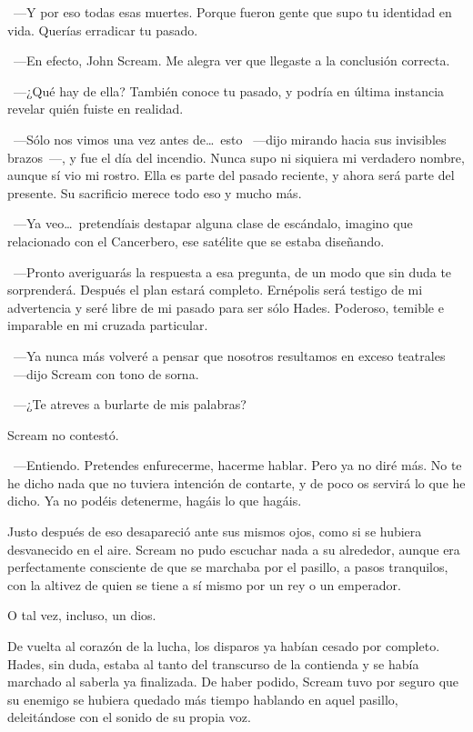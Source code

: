 ~---Y por eso todas esas muertes. Porque fueron gente que supo tu identidad en vida. Querías erradicar tu pasado.

~---En efecto, John Scream. Me alegra ver que llegaste a la conclusión correcta.

~---¿Qué hay de ella? También conoce tu pasado, y podría en última instancia revelar quién fuiste en realidad.

~---Sólo nos vimos una vez antes de\dots\ esto ~---dijo mirando hacia sus invisibles brazos~---, y fue el día del incendio. Nunca supo ni siquiera mi verdadero nombre, aunque sí vio mi rostro. Ella es parte del pasado reciente, y ahora será parte del presente. Su sacrificio merece todo eso y mucho más.

~---Ya veo\dots\ pretendíais destapar alguna clase de escándalo, imagino que relacionado con el Cancerbero, ese satélite que se estaba diseñando.

~---Pronto averiguarás la respuesta a esa pregunta, de un modo que sin duda te sorprenderá. Después el plan estará completo. Ernépolis será testigo de mi advertencia y seré libre de mi pasado para ser sólo Hades. Poderoso, temible e imparable en mi cruzada particular.

~---Ya nunca más volveré a pensar que nosotros resultamos en exceso teatrales ~---dijo Scream con tono de sorna.

~---¿Te atreves a burlarte de mis palabras?

Scream no contestó.

~---Entiendo. Pretendes enfurecerme, hacerme hablar. Pero ya no diré más. No te he dicho nada que no tuviera intención de contarte, y de poco os servirá lo que he dicho. Ya no podéis detenerme, hagáis lo que hagáis.

Justo después de eso desapareció ante sus mismos ojos, como si se hubiera desvanecido en el aire. Scream no pudo escuchar nada a su alrededor, aunque era perfectamente consciente de que se marchaba por el pasillo, a pasos tranquilos, con la altivez de quien se tiene a sí mismo por un rey o un emperador.

O tal vez, incluso, un dios.

\parbreak
De vuelta al corazón de la lucha, los disparos ya habían cesado por completo. Hades, sin duda, estaba al tanto del transcurso de la contienda y se había marchado al saberla ya finalizada. De haber podido, Scream tuvo por seguro que su enemigo se hubiera quedado más tiempo hablando en aquel pasillo, deleitándose con el sonido de su propia voz.

